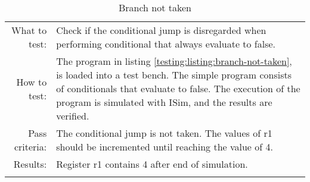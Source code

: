 \begin{table}[H]
  \begin{tabular}{r | p{8cm}}
    \noalign{\smallskip}\hline\noalign{\smallskip}
    
    What to test:  & Check if the conditional jump is disregarded when performing conditional
                     that always evaluate to false.\\

    \noalign{\smallskip}\hline\noalign{\smallskip}

    How to test:   &  The program in listing \ref{testing:listing:branch-not-taken}, is loaded into a test bench. 
                       The simple program consists of conditionals that evaluate to false. The
                       execution of the program is simulated with ISim, and the results are
                       verified. \\

    \noalign{\smallskip}\hline\noalign{\smallskip}

    Pass criteria: & The conditional jump is not taken. The values of r1 should be incremented
    until reaching the value of 4.\\

    \noalign{\smallskip}\hline\noalign{\smallskip}
    
    Results: &   Register r1 contains 4 after end of simulation.\\
   \noalign{\smallskip}\hline\noalign{\smallskip}
  
  \end{tabular}
  \caption{Branch not taken}
  \label{testing:fitness:branch_not_taken}
\end{table}
